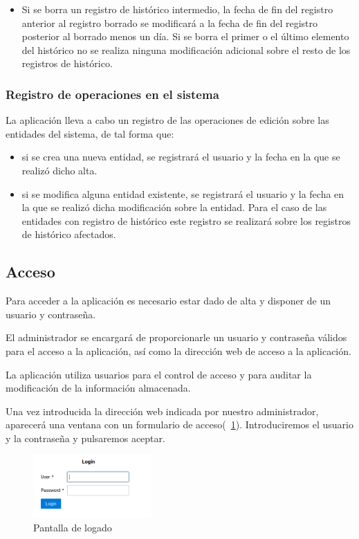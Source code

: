 \begin{itemize}
\begin{itemize}
	\end{itemize}
	\item Si se borra un registro de histórico intermedio, la fecha de fin del registro anterior al registro borrado se modificará a la fecha de fin del registro posterior al borrado menos un día. Si se borra el primer o el último elemento del histórico no se realiza ninguna modificación adicional sobre el resto de los registros de histórico.	
\end{itemize}


\subsubsection{Registro de operaciones en el sistema}
\label{sub:registro-operaciones}

La aplicación lleva a cabo un registro de las operaciones de edición sobre las entidades del sistema, de tal forma que:
\begin{itemize}
\item si se crea una nueva entidad, se registrará el usuario y la fecha en la que se realizó dicho alta.
\item si se modifica alguna entidad existente, se registrará el usuario y la fecha en la que se realizó dicha modificación sobre la entidad. Para el caso de las entidades con registro de histórico este registro se realizará sobre los registros de histórico afectados.
\end{itemize}



\subsection{Acceso}

Para acceder a la aplicación es necesario estar dado de alta y disponer de un
usuario y contraseña.

El administrador se encargará de proporcionarle un usuario y contraseña válidos para el acceso a la aplicación, así como la dirección web de acceso a la aplicación.

La aplicación utiliza usuarios para el control de acceso y para auditar la
modificación de la información almacenada. 

Una vez introducida la dirección web indicada por nuestro administrador, aparecerá una ventana con un formulario de acceso(\figurename~\ref{fig:login}). Introduciremos el usuario y la contraseña y pulsaremos aceptar. 


\begin{figure}[H]
  \centering
  \includegraphics[width=0.40\textwidth]{imaxes/login.png}
  \caption{Pantalla de logado}
  \label{fig:login}
\end{figure}

